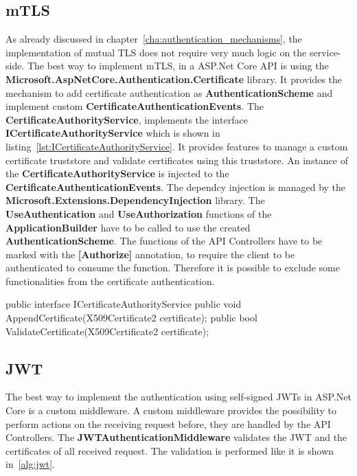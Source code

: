 \subsection{mTLS} \label{sec:impl_details_mtls}
As already discussed in chapter~\ref{cha:authentication_mechanisms}, the implementation of mutual TLS does not require very much logic on the service-side.
The best way to implement mTLS, in a ASP.Net Core API is using the \textbf{Microsoft.AspNetCore.Authentication.Certificate} library.
It provides the mechanism to add certificate authentication as \textbf{AuthenticationScheme} and implement custom \textbf{CertificateAuthenticationEvents}.
The \textbf{CertificateAuthorityService}, implements the interface \textbf{ICertificateAuthorityService} which is shown in listing~\ref{lst:ICertificateAuthorityService}.
It provides features to manage a custom certificate truststore and validate certificates using this truststore.
An instance of the \textbf{CertificateAuthorityService} is injected to the \textbf{CertificateAuthenticationEvents}.
The dependcy injection is managed by the \textbf{Microsoft.Extensions.DependencyInjection} library.
The \textbf{UseAuthentication} and \textbf{UseAuthorization} functions of the \textbf{ApplicationBuilder} have to be called to use the created \textbf{AuthenticationScheme}.
The functions of the API Controllers have to be marked with the \textbf{[Authorize]} annotation, to require the client to be authenticated to consume the function.
Therefore it is possible to exclude some functionalities from the certificate authentication.

\noindent \begin{minipage}{\linewidth}
\begin{CsCode}[label={lst:ICertificateAuthorityService}, caption={ICertificateAuthorityService interface, which is implemented by the injected CertificateAuthorityService},captionpos=b]
public interface ICertificateAuthorityService {
	public void AppendCertificate(X509Certificate2 certificate);
	public bool ValidateCertificate(X509Certificate2 certificate);
}
\end{CsCode}
\end{minipage}

\subsection{JWT}
The best way to implement the authentication using self-signed JWTs in ASP.Net Core is a custom middleware.
A custom middleware provides the possibility to perform actions on the receiving request before, they are handled by the API Controllers.
The \textbf{JWTAuthenticationMiddleware} validates the JWT and the certificates of all received request.
The validation is performed like it is shown in~\ref{alg:jwt}.

